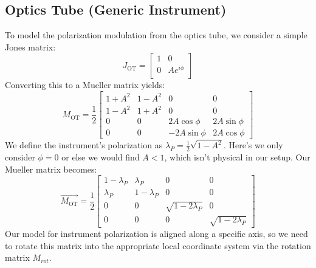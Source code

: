 \subsection{Optics Tube (Generic Instrument)}
To model the polarization modulation from the optics tube, we consider a simple Jones matrix:
\begin{equation}
    J_{\text{OT}} = \begin{bmatrix}
    1 & 0 \\
    0 & A e^{i\phi}\\
  \end{bmatrix}
\end{equation}
Converting this to a Mueller matrix yields:
\begin{equation}
    M_{\text{OT}} = \frac{1}{2}\begin{bmatrix}
    1+A^2 & 1-A^2 & 0& 0\\
    1-A^2 & 1+A^2 & 0& 0\\
    0 & 0 & 2A\cos\phi & 2A\sin\phi\\
    0 & 0 & -2A\sin\phi & 2A\cos\phi
  \end{bmatrix}
\end{equation}
We define the instrument's polarization as $\lambda_P = \frac{1}{2}\sqrt{1-A^2}$.  Here's we only consider $\phi=0$ or else we would find $A<1$, which isn't physical in our setup.  Our Mueller matrix becomes:
\begin{equation}
    \vec{M_{\text{OT}}}= \frac{1}{2}\begin{bmatrix}
    1-\lambda_P & \lambda_P & 0& 0\\
    \lambda_P & 1-\lambda_P & 0& 0\\
    0 & 0 & \sqrt{1-2\lambda_P} & 0\\
    0 & 0 & 0 & \sqrt{1-2\lambda_P}
  \end{bmatrix}
\end{equation}
Our model for instrument polarization is aligned along a specific axis, so we need to rotate this matrix into the appropriate local coordinate system via the rotation matrix $M_{rot}$.
